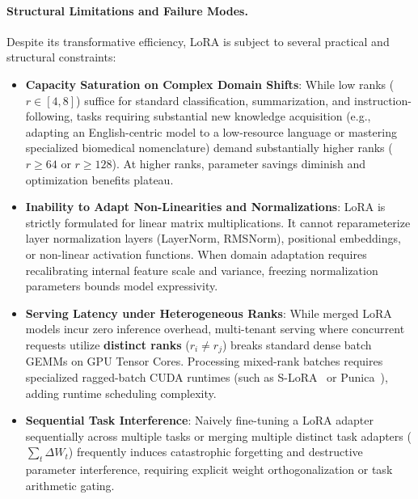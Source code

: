\documentclass[../../../main.tex]{subfiles}
\begin{document}
\paragraph{Structural Limitations and Failure Modes.}
Despite its transformative efficiency, LoRA is subject to several practical and structural constraints:
\begin{itemize}
    \item \textbf{Capacity Saturation on Complex Domain Shifts}: While low ranks ($r \in [4, 8]$) suffice for standard classification, summarization, and instruction-following, tasks requiring substantial new knowledge acquisition (e.g., adapting an English-centric model to a low-resource language or mastering specialized biomedical nomenclature) demand substantially higher ranks ($r \ge 64$ or $r \ge 128$). At higher ranks, parameter savings diminish and optimization benefits plateau.
    \item \textbf{Inability to Adapt Non-Linearities and Normalizations}: LoRA is strictly formulated for linear matrix multiplications. It cannot reparameterize layer normalization layers (LayerNorm, RMSNorm), positional embeddings, or non-linear activation functions. When domain adaptation requires recalibrating internal feature scale and variance, freezing normalization parameters bounds model expressivity.
    \item \textbf{Serving Latency under Heterogeneous Ranks}: While merged LoRA models incur zero inference overhead, multi-tenant serving where concurrent requests utilize \textbf{distinct ranks} ($r_i \neq r_j$) breaks standard dense batch GEMMs on GPU Tensor Cores. Processing mixed-rank batches requires specialized ragged-batch CUDA runtimes (such as S-LoRA~\citep{sheng2023slora} or Punica~\citep{chen2023punica}), adding runtime scheduling complexity.
    \item \textbf{Sequential Task Interference}: Naively fine-tuning a LoRA adapter sequentially across multiple tasks or merging multiple distinct task adapters ($\sum_t \Delta W_t$) frequently induces catastrophic forgetting and destructive parameter interference, requiring explicit weight orthogonalization or task arithmetic gating.
\end{itemize}
\end{document}
